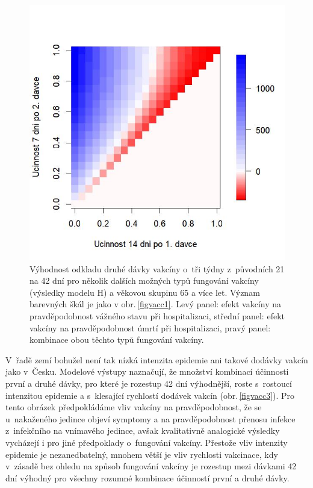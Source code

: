 \begin{figure}[ht]
\begin{center}
\begin{minipage}[m]{0.3\linewidth}
		\end{minipage}
		\begin{minipage}[m]{0.3\linewidth}
			\includegraphics[width=\textwidth]{pic/JDL_DIFF_mean_T.jpg}
		\end{minipage}
	\end{center}
	\caption{Výhodnost odkladu druhé dávky vakcíny o~tři týdny z~původních 21 na 42 dní pro několik dalších možných typů fungování vakcíny (výsledky modelu H) a věkovou skupinu 65 a více let. Význam barevných škál je jako v obr.\,\ref{figvacc1}. Levý panel: efekt vakcíny na pravděpodobnost vážného stavu při hospitalizaci, střední panel: efekt vakcíny na pravděpodobnost úmrtí při hospitalizaci, pravý panel: kombinace obou těchto typů fungování vakcíny.}
	\label{figvacc2}
\end{figure}

V~řadě zemí bohužel není tak nízká intenzita epidemie ani takové dodávky vakcín jako v~Česku. Modelové výstupy naznačují, že množství kombinací účinnosti první a druhé dávky, pro které je rozestup 42 dní výhodnější, roste s~rostoucí intenzitou epidemie a s~klesající rychlostí dodávek vakcín (obr.\,\ref{figvacc3}). Pro tento obrázek předpokládáme vliv vakcíny na pravděpodobnost, že se u~nakaženého jedince objeví symptomy a na pravděpodobnost přenosu infekce z~infekčního na vnímavého jedince, avšak kvalitativně analogické výsledky vycházejí i pro jiné předpoklady o~fungování vakcíny. Přestože vliv intenzity epidemie je nezanedbatelný, mnohem větší je vliv rychlosti vakcinace, kdy v~zásadě bez ohledu na způsob fungování vakcíny je rozestup mezi dávkami 42 dní výhodný pro všechny rozumné kombinace účinností první a druhé dávky.

